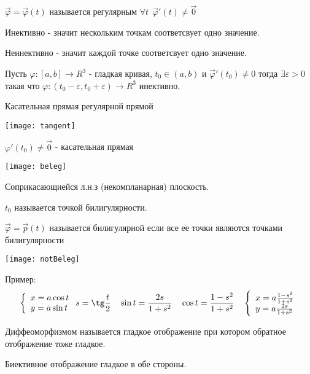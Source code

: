 \begin{define}
  $\vec \varphi = \vec \varphi (t)$ называется регулярным
  $\forall t ~~ \vec \varphi' (t) \not = \vec 0$
\end{define}

\begin{define}
  Инективно - значит нескольким точкам соответсвует одно значение.

  Неинективно - значит каждой точке соответсвует одно значение.
\end{define}

\begin{theorem}
  Пусть $\varphi : [a,b] \to R^3$ - гладкая кривая, $t_0 \in (a,b)$ и
  $\vec \varphi' (t_0) \not = 0$ тогда $\exists \varepsilon > 0$ такая что
  $\varphi : (t_0 - \varepsilon, t_0 + \varepsilon) \to R^3$ инективно.
\end{theorem}

Касательная прямая регулярной прямой

\texttt{[image: tangent]}

$\varphi' (t_0) \not = \vec 0$ - касательная прямая

\texttt{[image: beleg]}

Соприкасающиейся  л.н.з (некомпланарная) плоскость.

$t_0$ называется точкой билигулярности.

$\vec \varphi = \vec p(t)$ называется билигулярной если все ее точки являются
точками билигулярности

\texttt{[image: notBeleg]}

Пример:
$$
\left\{
\begin{array}{l}
x = a \cos t \\
y = a \sin t
\end{array}
\right.
s = \tg \frac{t}{2} ~~~ \sin t = \frac{2s}{1+s^2} ~~~
\cos t = \frac{1-s^2}{1+s^2} ~~~
\left\{
\begin{array}{l}
x = a \frac{1-s^2}{1+s^2} \\
y = a \frac{2s}{1+s^2}
\end{array}
\right.
$$

\begin{define}[диффеоморфизма]
  Диффеоморфизмом называется гладкое отображение при котором обратное
  отображение тоже гладкое.
\end{define}

Биективное отображение гладкое в обе стороны.

